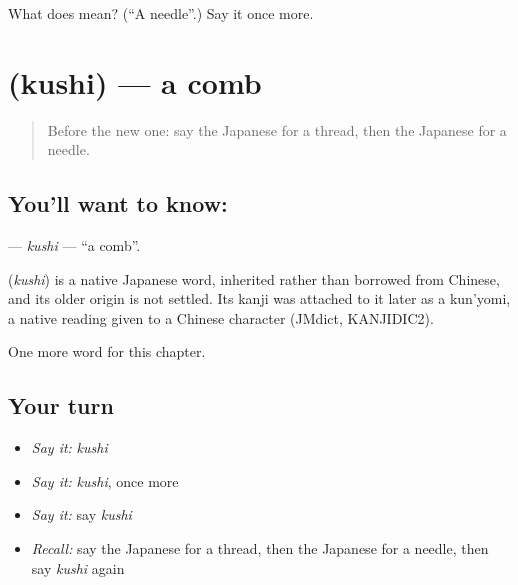 \begin{tcolorbox}[breakable,colback=teal!4,colframe=teal!35!black,title={Before you move on}]
What does  mean? (\textquotedblleft{}A needle\textquotedblright{}.) Say it once more.
\end{tcolorbox}
\section[\texorpdfstring{\ja{くし} (kushi)}{くし (kushi)}]{ (kushi) — a comb}

\label{lesson:JA-C61-kushi}



\begin{quote}
Before the new one: say the Japanese for a thread, then the Japanese for a needle.
\end{quote}

\subsection*{You'll want to know: }
\textbf{} — \emph{kushi} — \textquotedblleft{}a comb\textquotedblright{}.

\begin{cousinweb}
\textbf{} (\emph{kushi}) is a native Japanese word, inherited rather than borrowed from Chinese, and its older origin is not settled. Its kanji was attached to it later as a kun'yomi, a native reading given to a Chinese character (JMdict, KANJIDIC2).
\end{cousinweb}

\begin{grammarlens}[title={What you've built}]
One more word for this chapter.
\end{grammarlens}

\subsection*{Your turn}
\begin{itemize}
\raggedright
  \item \emph{Say it:} \emph{kushi}
  \item \emph{Say it:} \emph{kushi}, once more
  \item \emph{Say it:} say \emph{kushi}
  \item \emph{Recall:} say the Japanese for a thread, then the Japanese for a needle, then say \emph{kushi} again
\end{itemize}

